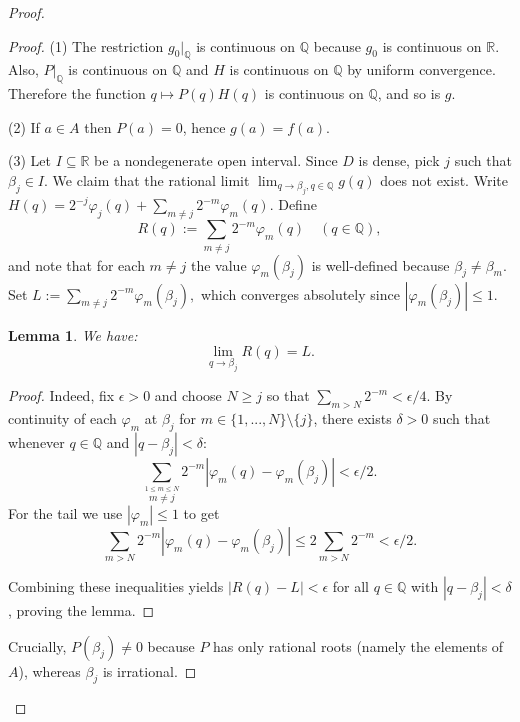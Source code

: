 \documentclass[11pt]{amsart} %
\newtheorem{lemma}[theorem]{Lemma}
\theoremstyle{definition}
\begin{document}
\begin{proof}
\begin{proof}
(1) The restriction $g_{0}|_{\mathbb{Q}}$ is continuous on $\mathbb{Q}$ because $g_{0}$ is continuous on $\mathbb{R}$. Also, $P|_{\mathbb{Q}}$ is continuous on $\mathbb{Q}$ and $H$ is continuous on $\mathbb{Q}$ by uniform convergence. Therefore the function $q\mapsto P(q)H(q)$ is continuous on $\mathbb{Q}$, and so is $g$.

(2) If $a\in A$ then $P(a)=0$, hence $g(a)=f(a).$

(3) Let $I\subseteq\mathbb{R}$ be a nondegenerate open interval. Since $D$ is dense, pick $j$ such that $\beta_{j}\in I$. We claim that the rational limit $\lim_{q\rightarrow\beta_{j},q\in\mathbb{Q}}g(q)$ does not exist. Write $H(q)=2^{-j}\varphi_{j}(q)+\sum_{m\ne j}2^{-m}\varphi_{m}(q).$
Define
\begin{equation} 
R(q):=\sum_{m\ne j}2^{-m}\varphi_{m}(q) \quad (q\in\mathbb{Q}), \end{equation}
and note that for each $m\ne j$ the value $\varphi_{m}(\beta_{j})$ is well-defined because $\beta_{j}\ne\beta_{m}$. Set $L:=\sum_{m\ne j}2^{-m}\varphi_{m}(\beta_{j}),$ 
which converges absolutely since $|\varphi_{m}(\beta_{j})|\le1$.
\begin{lemma}  We have:
\begin{equation} 
\lim_{q\rightarrow\beta_{j}}R(q)=L.
\end{equation} 
\end{lemma} 
\begin{proof} 
Indeed, fix $\epsilon>0$ and choose $N\geq j$ so that $\sum_{m>N}2^{-m}<\epsilon/4$. By continuity of each $\varphi_{m}$ at $\beta_{j}$ for $m\in\{1,...,N\}\setminus\{j\}$, there exists $\delta>0$ such that whenever $q\in\mathbb{Q}$ and $|q-\beta_{j}|<\delta$:
\begin{equation} 
\sum_{\stackrel{1\le m\le N}{m\neq j}}2^{-m}|\varphi_{m}(q)-\varphi_{m}(\beta_{j})|<\epsilon/2. 
\end{equation} 
For the tail we use $|\varphi_{m}|\le1$ to get
\begin{equation} 
\sum_{m>N}2^{-m}|\varphi_{m}(q)-\varphi_{m}(\beta_{j})|\le2\sum_{m>N}2^{-m}<\epsilon/2.
\end{equation}  

Combining these inequalities yields $|R(q)-L|<\epsilon$ for all $q\in\mathbb{Q}$ with $|q-\beta_{j}|<\delta$, proving the lemma.
\end{proof} 

Crucially, $P(\beta_{j})\ne0$ because $P$ has only rational roots (namely the elements of $A$), whereas $\beta_{j}$ is irrational.


\end{proof}
\end{proof}
\end{document}
